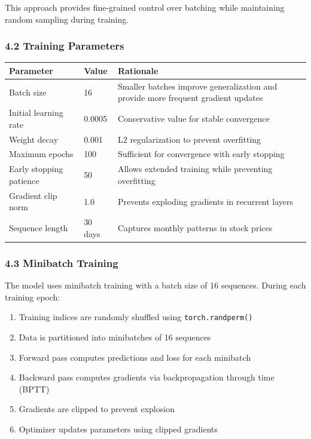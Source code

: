 \documentclass[
]{article}
\newcounter{none} %
\begin{document}
This approach provides fine-grained control over batching while
maintaining random sampling during training.

\subsubsection{4.2 Training Parameters}\label{42-training-parameters}

{\def\LTcaptype{none} %
\begin{longtable}[]{@{}p{}p{}p{}@{}}
\toprule\noalign{}
Parameter & Value & Rationale \\
\midrule\noalign{}
\endhead
\bottomrule\noalign{}
\endlastfoot
Batch size & 16 & Smaller batches improve generalization and provide more frequent gradient updates \\
Initial learning rate & 0.0005 & Conservative value for stable convergence \\
Weight decay & 0.001 & L2 regularization to prevent overfitting \\
Maximum epochs & 100 & Sufficient for convergence with early stopping \\
Early stopping patience & 50 & Allows extended training while preventing overfitting \\
Gradient clip norm & 1.0 & Prevents exploding gradients in recurrent layers \\
Sequence length & 30 days & Captures monthly patterns in stock prices \\
\end{longtable}
}

\subsubsection{4.3 Minibatch Training}\label{43-minibatch-training}

The model uses minibatch training with a batch size of 16 sequences.
During each training epoch:

\begin{enumerate}
\def\labelenumi{\arabic{enumi}.}
\item
  Training indices are randomly shuffled using \texttt{torch.randperm()}
\item
  Data is partitioned into minibatches of 16 sequences
\item
  Forward pass computes predictions and loss for each minibatch
\item
  Backward pass computes gradients via backpropagation through time
  (BPTT)
\item
  Gradients are clipped to prevent explosion
\item
  Optimizer updates parameters using clipped gradients
\end{enumerate}
\end{document}
